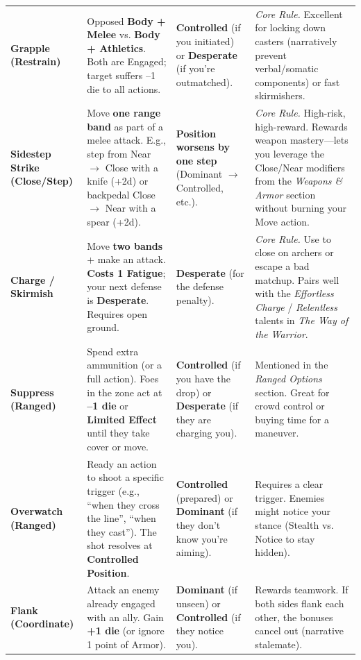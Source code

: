 \begin{center}
\begin{longtable}{p{2.2cm}p{2.8cm}p{2.0cm}p{4.6cm}}
\textbf{Grapple (Restrain)} & Opposed \textbf{Body + Melee} vs. \textbf{Body + Athletics}. Both are Engaged; target suffers --1 die to all actions. & \textbf{Controlled} (if you initiated) or \textbf{Desperate} (if you're outmatched). & \textit{Core Rule.} Excellent for locking down casters (narratively prevent verbal/somatic components) or fast skirmishers. \\

\textbf{Sidestep Strike (Close/Step)} & Move \textbf{one range band} as part of a melee attack. E.g., step from Near $\to$ Close with a knife (+2d) or backpedal Close $\to$ Near with a spear (+2d). & \textbf{Position worsens by one step} (Dominant $\to$ Controlled, etc.). & \textit{Core Rule.} High-risk, high-reward. Rewards weapon mastery---lets you leverage the Close/Near modifiers from the \textit{Weapons \& Armor} section without burning your Move action. \\

\textbf{Charge / Skirmish} & Move \textbf{two bands} + make an attack. \textbf{Costs 1 Fatigue}; your next defense is \textbf{Desperate}. Requires open ground. & \textbf{Desperate} (for the defense penalty). & \textit{Core Rule.} Use to close on archers or escape a bad matchup. Pairs well with the \textit{Effortless Charge} / \textit{Relentless} talents in \textit{The Way of the Warrior}. \\

\textbf{Suppress (Ranged)} & Spend extra ammunition (or a full action). Foes in the zone act at \textbf{--1 die} or \textbf{Limited Effect} until they take cover or move. & \textbf{Controlled} (if you have the drop) or \textbf{Desperate} (if they are charging you). & Mentioned in the \textit{Ranged Options} section. Great for crowd control or buying time for a maneuver. \\

\textbf{Overwatch (Ranged)} & Ready an action to shoot a specific trigger (e.g., ``when they cross the line'', ``when they cast''). The shot resolves at \textbf{Controlled Position}. & \textbf{Controlled} (prepared) or \textbf{Dominant} (if they don't know you're aiming). & Requires a clear trigger. Enemies might notice your stance (Stealth vs. Notice to stay hidden). \\

\textbf{Flank (Coordinate)} & Attack an enemy already engaged with an ally. Gain \textbf{+1 die} (or ignore 1 point of Armor). & \textbf{Dominant} (if unseen) or \textbf{Controlled} (if they notice you). & Rewards teamwork. If both sides flank each other, the bonuses cancel out (narrative stalemate). \\


\end{longtable}
\end{center}
